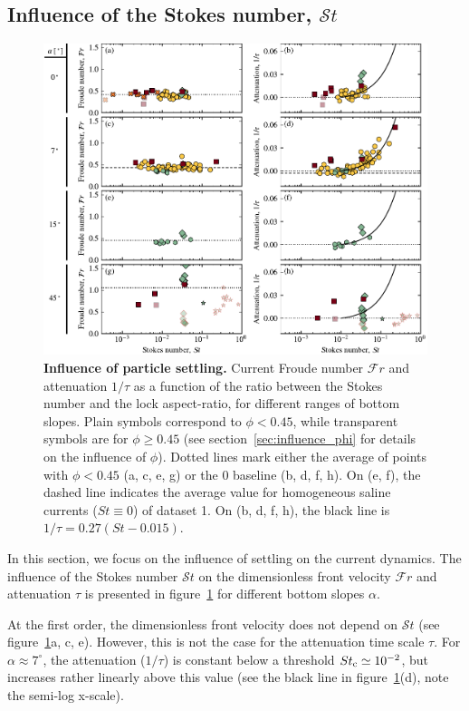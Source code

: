 \documentclass[12pt]{article}
\begin{document}
\subsection{Influence of the Stokes number, $\mathcal{S}t$}
\label{sec:influence_stokes}

\begin{figure}
	\centering
	\includegraphics{figure5.pdf}
	\caption{\textbf{Influence of particle settling.} Current Froude number $\mathcal{F}r$ and attenuation $1/\tau$ as a function of the ratio between the Stokes number and the lock aspect-ratio, for different ranges of bottom slopes. Plain symbols correspond to $\phi < 0.45$, while transparent symbols are for $\phi \geq 0.45$ (see section~\ref{sec:influence_phi} for details on the influence of $\phi$). Dotted lines mark either the average of points with $\phi < 0.45$ (a, c, e, g) or the 0 baseline (b, d, f, h). On (e, f), the dashed line indicates the average value for homogeneous saline currents ($St \equiv 0$) of dataset 1. On (b, d, f, h), the black line is $1/\tau = 0.27 (St - 0.015)$.}
	\label{fig:fig5}
\end{figure}

In this section, we focus on the influence of settling on the current dynamics. The influence of the Stokes number $\mathcal{S}t$ on the dimensionless front velocity $\mathcal{F}r$ and attenuation $\tau$ is presented in figure~\ref{fig:fig5} for different bottom slopes $\alpha$.

At the first order, the dimensionless front velocity does not depend on $\mathcal{S}t$ (see figure~\ref{fig:fig5}a, c, e). However, this is not the case for the attenuation time scale $\tau$. For $\alpha \approx 7^\circ$, the attenuation ($1/\tau$) is constant below a threshold $St_{\text c} \simeq 10^{-2}$, but increases rather linearly above this value (see the black line in figure~\ref{fig:fig5}(d), note the semi-log x-scale).
\end{document}
